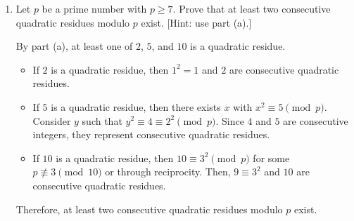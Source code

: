\begin{enumerate}
\begin{enumerate}
\begin{subanswer}
      For the product of these three $\pm 1$ values to be $1$, an even number of $-1$s (zero or two) must exist.
      \begin{itemize}
      \item If zero $-1$s exist, all three values are $1$. This gives \textbf{three} quadratic residues.
      \item If two $-1$s exist, one value is $1$. This gives \textbf{one} quadratic residue.
      \end{itemize}
      It is impossible to have exactly two $+1$ values (quadratic residues), as this would require one $-1$ value, making the product $-1$. Therefore, the number of quadratic residues among $\{2, 5, 10\}$ must be odd (one or three), never two.
    \end{subanswer}
    \item Let $p$ be a prime number with $p \geq 7$. Prove that at least two consecutive quadratic residues modulo $p$ exist. [Hint: use part (a).]
    \begin{subprove}
      By part (a), at least one of $2$, $5$, and $10$ is a quadratic residue.
      \begin{itemize}
        \item If $2$ is a quadratic residue, then $1^2 = 1$ and $2$ are consecutive quadratic residues.
        \item If $5$ is a quadratic residue, then there exists $x$ with $x^2 \equiv 5\pmod{p}$. Consider $y$ such that $y^2 \equiv 4 \equiv 2^2\pmod{p}$. Since $4$ and $5$ are consecutive integers, they represent consecutive quadratic residues.
        \item If $10$ is a quadratic residue, then $10 \equiv 3^2 \pmod{p}$ for some $p\not\equiv 3\pmod{10}$ or through reciprocity. Then, $9 \equiv 3^2$ and $10$ are consecutive quadratic residues.
      \end{itemize}
      Therefore, at least two consecutive quadratic residues modulo $p$ exist.
    \end{subprove}
  \end{enumerate}



\end{enumerate}
